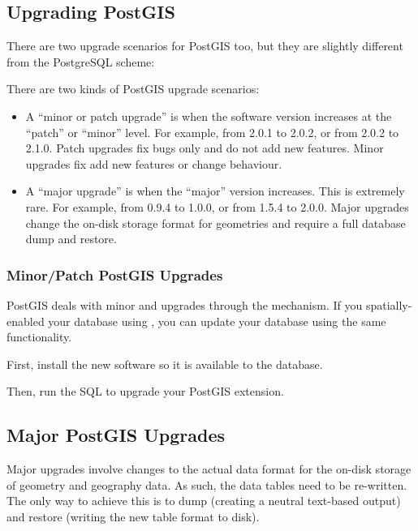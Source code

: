 \documentclass[a4paper,11pt,english]{sphinxmanual}
\begin{document}
\subsection{Upgrading PostGIS}
\label{\detokenize{maintenance:upgrading-postgis}}
There are two upgrade scenarios for PostGIS too, but they are slightly different from the PostgreSQL scheme:

There are two kinds of PostGIS upgrade scenarios:
\begin{itemize}
\item {} 
A “minor or patch upgrade” is when the software version increases at the “patch” or “minor” level. For example, from 2.0.1 to 2.0.2, or from 2.0.2 to 2.1.0. Patch upgrades fix bugs only and do not add new features. Minor upgrades fix add new features or change behaviour.

\item {} 
A “major upgrade” is when the “major” version increases. This is extremely rare. For example, from 0.9.4 to 1.0.0, or from 1.5.4 to 2.0.0. Major upgrades change the on-disk storage format for geometries and require a full database dump and restore.

\end{itemize}


\subsubsection{Minor/Patch PostGIS Upgrades}
\label{\detokenize{maintenance:minor-patch-postgis-upgrades}}
PostGIS deals with minor and upgrades through the  mechanism. If you spatially-enabled your database using , you can update your database using the same functionality.

First, install the new software so it is available to the database.

Then, run the SQL to upgrade your PostGIS extension.

\begin{sphinxVerbatim}[commandchars=\\\{\}]
     
\end{sphinxVerbatim}


\subsection{Major PostGIS Upgrades}
\label{\detokenize{maintenance:major-postgis-upgrades}}
Major upgrades involve changes to the actual data format for the on-disk storage of geometry and geography data. As such, the data tables need to be re-written. The only way to achieve this is to dump (creating a neutral text-based output) and restore (writing the new table format to disk).
\end{document}
